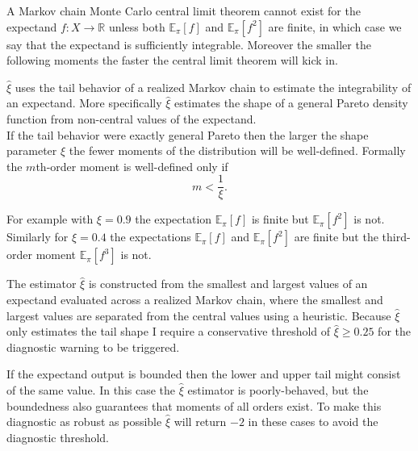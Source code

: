 \documentclass[
  letterpaper,
  DIV=11,
  numbers=noendperiod]{scrartcl}
\begin{document}
A Markov chain Monte Carlo central limit theorem cannot exist for the
expectand \(f : X \rightarrow \mathbb{R}\) unless both
\(\mathbb{E}_{\pi}[f]\) and \(\mathbb{E}_{\pi}[f^{2}]\) are finite, in
which case we say that the expectand is sufficiently integrable.
Moreover the smaller the following moments the faster the central limit
theorem will kick in.

\(\hat{\xi}\) uses the tail behavior of a realized Markov chain to
estimate the integrability of an expectand. More specifically
\(\hat{\xi}\) estimates the shape of a general Pareto density function
from non-central values of the expectand.\\
If the tail behavior were exactly general Pareto then the larger the
shape parameter \(\xi\) the fewer moments of the distribution will be
well-defined. Formally the \(m\)th-order moment is well-defined only if
\[
m < \frac{1}{\xi}.
\]

For example with \(\xi = 0.9\) the expectation \(\mathbb{E}_{\pi}[f]\)
is finite but \(\mathbb{E}_{\pi}[f^{2}]\) is not. Similarly for
\(\xi = 0.4\) the expectations \(\mathbb{E}_{\pi}[f]\) and
\(\mathbb{E}_{\pi}[f^{2}]\) are finite but the third-order moment
\(\mathbb{E}_{\pi}[f^{3}]\) is not.

The estimator \(\hat{\xi}\) is constructed from the smallest and largest
values of an expectand evaluated across a realized Markov chain, where
the smallest and largest values are separated from the central values
using a heuristic. Because \(\hat{\xi}\) only estimates the tail shape I
require a conservative threshold of \(\hat{\xi} \ge 0.25\) for the
diagnostic warning to be triggered.

If the expectand output is bounded then the lower and upper tail might
consist of the same value. In this case the \(\hat{\xi}\) estimator is
poorly-behaved, but the boundedness also guarantees that moments of all
orders exist. To make this diagnostic as robust as possible
\(\hat{\xi}\) will return \(-2\) in these cases to avoid the diagnostic
threshold.
\end{document}
